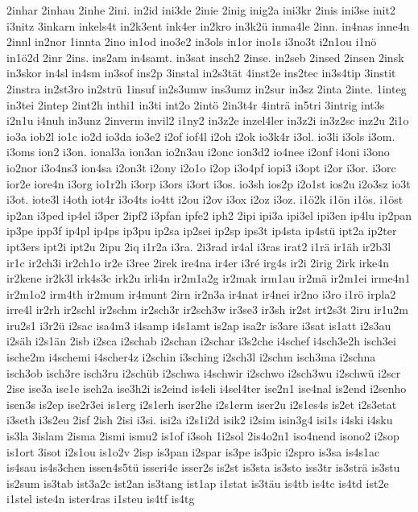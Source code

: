 {2inhar
2inhau
2inhe
2ini.
in2id
ini3de
2inie
2inig
inig2a
ini3kr
2inis
ini3se
init2
i3nitz
3inkarn
inkels4t
in2k3ent
ink4er
in2kro
in3k2ü
inma4le
2inn.
in4nas
inne4n
2innl
in2nor
1innta
2ino
in1od
ino3e2
in3ols
in1or
ino1s
i3no3t
i2n1ou
i1nö
in1ö2d
2inr
2ins.
ins2am
in4samt.
in3sat
insch2
2inse.
in2seb
2insed
2insen
2insk
in3skor
in4sl
in4sm
in3sof
ins2p
3instal
in2s3tät
4inst2e
ins2tec
in3s4tip
3instit
2instra
in2st3ro
in2strü
1insuf
in2s3umw
ins3umz
in2sur
in3sz
2inta
2inte.
1integ
in3tei
2intep
2int2h
inthi1
in3ti
int2o
2intö
2in3t4r
4inträ
in5tri
3intrig
int3s
i2n1u
i4nuh
in3unz
2inverm
invil2
i1ny2
in3z2e
inzel4ler
in3z2i
in3z2sc
inz2u
2i1o
io3a
iob2l
io1c
io2d
io3da
io3e2
i2of
iof4l
i2oh
i2ok
io3k4r
i3ol.
io3li
i3ols
i3om.
i3oms
ion2
i3on.
ional3a
ion3an
io2n3au
i2onc
ion3d2
io4nee
i2onf
i4oni
i3ono
io2nor
i3o4ns3
ion4sa
i2on3t
i2ony
i2o1o
i2op
i3o4pf
iopi3
i3opt
i2or
i3or.
i3orc
ior2e
iore4n
i3org
io1r2h
i3orp
i3ors
i3ort
i3os.
io3sh
ios2p
i2o1st
ios2u
i2o3sz
io3t
i3ot.
iote3l
i4oth
iot4r
i3o4ts
io4tt
i2ou
i2ov
i3ox
i2oz
i3oz.
i1ö2k
i1ön
i1ös.
i1öst
ip2an
i3ped
ip4el
i3per
2ipf2
i3pfan
ipfe2
iph2
2ipi
ipi3a
ipi3el
ipi3en
ip4lu
ip2pan
ip3pe
ipp3f
ip4pl
ip4ps
ip3pu
ip2sa
ip2sei
ip2sp
ips3t
ip4sta
ip4stü
ipt2a
ip2ter
ipt3ers
ipt2i
ipt2u
2ipu
2iq
i1r2a
i3ra.
2i3rad
ir4al
i3ras
irat2
i1rä
ir1äh
ir2b3l
ir1c
ir2ch3i
ir2ch1o
ir2e
i3ree
2irek
ire4na
ir4er
i3ré
irg4s
ir2i
2irig
2irk
irke4n
ir2kene
ir2k3l
irk4s3c
irk2u
irli4n
ir2m1a2g
ir2mak
irm1au
ir2mä
ir2m1ei
irme4n1
ir2m1o2
irm4th
ir2mum
ir4munt
2irn
ir2n3a
ir4nat
ir4nei
ir2no
i3ro
i1rö
irpla2
irre4l
ir2rh
ir2schl
ir2schm
ir2sch3r
ir2sch3w
ir3se3
ir3sh
ir2st
irt2s3t
2iru
ir1u2m
iru2s1
i3r2ü
i2sac
isa4m3
i4samp
i4s1amt
is2ap
isa2r
is3are
i3sat
is1att
i2s3au
i2säh
i2s1än
2isb
i2sca
i2schab
i2schan
i2schar
i3s2che
i4schef
i4sch3e2h
isch3ei
ische2m
i4schemi
i4scher4z
i2schin
i3sching
i2sch3l
i2schm
isch3ma
i2schna
isch3ob
isch3re
isch3ru
i2schüb
i2schwa
i4schwir
i2schwo
i2sch3wu
i2schwü
i2scr
2ise
ise3a
ise1e
iseh2a
ise3h2i
is2eind
is4eli
i4sel4ter
ise2n1
ise4nal
is2end
i2senho
isen3s
is2ep
ise2r3ei
is1erg
i2s1erh
iser2he
i2s1erm
iser2u
i2s1es4s
is2et
i2s3etat
i3seth
i3s2eu
2isf
2ish
2isi
i3si.
isi2a
i2s1i2d
isik2
i2sim
isin3g4
isi1s
i4ski
i4sku
is3la
3islam
2isma
2ismi
ismu2
is1of
i3soh
1i2sol
2is4o2n1
iso4nend
isono2
i2sop
is1ort
3isot
i2s1ou
is1o2v
2isp
is3pan
i2spar
is3pe
is3pic
i2spro
is3sa
is4s1ac
is4sau
is4s3chen
issen4s5tü
isseri4e
isser2s
is2st
is3sta
is3sto
iss3tr
is3strä
is3stu
is2sum
is3tab
ist3a2c
ist2an
is3tang
ist1ap
i1stat
is3täu
is4tb
is4tc
is4td
ist2e
i1stel
iste4n
ister4ras
i1steu
is4tf
is4tg
}
